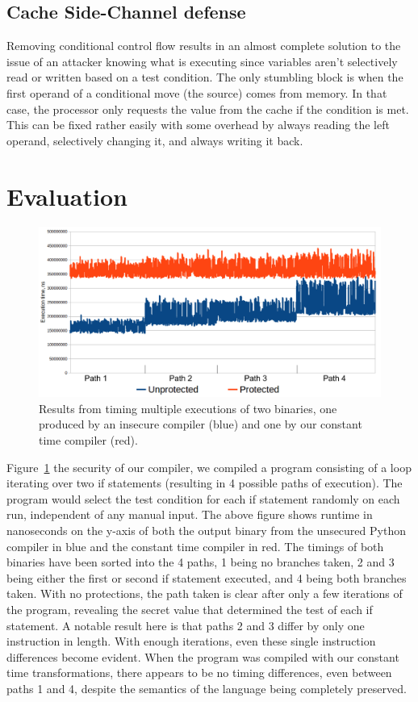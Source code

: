 \documentclass[sigplan, review]{acmart}
\begin{document}
\subsection{Cache Side-Channel defense}
Removing conditional control flow results in an almost complete solution to the issue of an attacker knowing what is executing since variables aren't selectively read or written based on a test condition. The only stumbling block is when the first operand of a conditional move (the source) comes from memory. In that case, the processor only requests the value from the cache if the condition is met. This can be fixed rather easily with some overhead by always reading the left operand, selectively changing it, and always writing it back.

\section{Evaluation}

\begin{figure}[tp]
\includegraphics[width=\textwidth]{./timings_protected_vs_unprotected.png}
\caption{Results from timing multiple executions of two binaries, one produced by an insecure compiler (blue) and one by our constant time compiler (red).}
\label{fig:timings}
\end{figure}

Figure~\ref{fig:timings} the security of our compiler, we compiled a program consisting of a loop iterating over two if statements (resulting in 4 possible paths of execution). The program would select the test condition for each if statement randomly on each run, independent of any manual input. The above figure shows runtime in nanoseconds on the y-axis of both the output binary from the unsecured Python compiler in blue and the constant time compiler in red. The timings of both binaries have been sorted into the 4 paths, 1 being no branches taken, 2 and 3 being either the first or second if statement executed, and 4 being both branches taken. With no protections, the path taken is clear after only a few iterations of the program, revealing the secret value that determined the test of each if statement. A notable result here is that paths 2 and 3 differ by only one instruction in length. With enough iterations, even these single instruction differences become evident. When the program was compiled with our constant time transformations, there appears to be no timing differences, even between paths 1 and 4, despite the semantics of the language being completely preserved.
\end{document}
